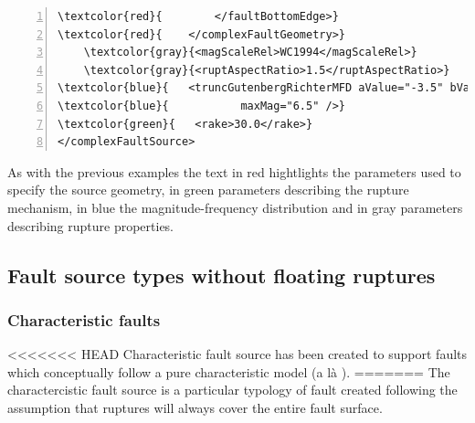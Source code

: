 \begin{itemize}
\begin{Verbatim}[frame=single, commandchars=\\\{\}, fontsize=\footnotesize,
    numbers=left, numbersep=2pt]
\textcolor{red}{        </faultBottomEdge>}
\textcolor{red}{    </complexFaultGeometry>}
    \textcolor{gray}{<magScaleRel>WC1994</magScaleRel>}
    \textcolor{gray}{<ruptAspectRatio>1.5</ruptAspectRatio>}
\textcolor{blue}{   <truncGutenbergRichterMFD aValue="-3.5" bValue="1.0" minMag="5.0" }
\textcolor{blue}{			maxMag="6.5" />}
\textcolor{green}{   <rake>30.0</rake>}
</complexFaultSource>
\end{Verbatim}
As with the previous examples the text in red hightlights the parameters
used to specify the source geometry, in green parameters describing the 
rupture mechanism, in blue the magnitude-frequency distribution and in 
gray parameters describing rupture properties. 
%
\subsection{Fault source types without floating ruptures}
\subsubsection{Characteristic faults}
<<<<<<< HEAD
Characteristic fault source has been created to support 
faults which conceptually follow a pure characteristic model
(a l\`{a} \cite{schwartz1984}).
=======
The charactercistic fault source is a particular typology of fault
created following the assumption that ruptures will always cover 
the entire fault surface. 


\end{itemize}
